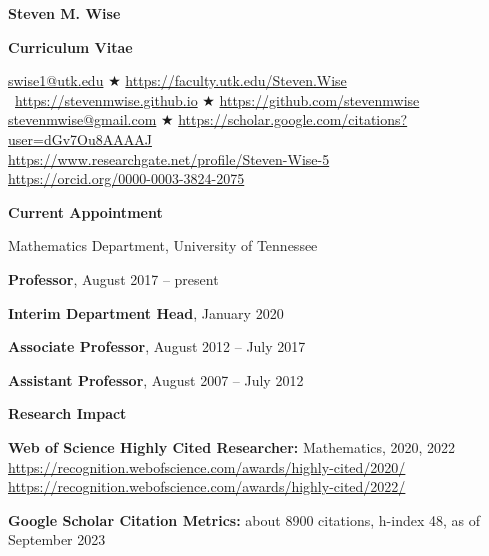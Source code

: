\documentclass[11pt]{letter}
\begin{document}
    
    \begin{center}
    
{\Huge\bf  Steven M. Wise}

{\Large\bf  Curriculum Vitae}


\url{swise1@utk.edu}  $\bigstar$  \url{https://faculty.utk.edu/Steven.Wise}
	\
\url{https://stevenmwise.github.io}  $\bigstar$    \url{https://github.com/stevenmwise}
	\\
\url{stevenmwise@gmail.com}  $\bigstar$   \url{https://scholar.google.com/citations?user=dGv7Ou8AAAAJ}
	\\
\url{https://www.researchgate.net/profile/Steven-Wise-5}
	\\
\url{https://orcid.org/0000-0003-3824-2075}
    \end{center}

    \medskip

{\LARGE\bf  Current Appointment}
    \begin{description}
    \item
Mathematics Department, University of Tennessee
	\begin{description}
	\item
\textbf{Professor}, August 2017 -- present
	\item
\textbf{Interim Department Head}, January 2020
	\item
\textbf{Associate Professor}, August 2012 -- July 2017
	\item
\textbf{Assistant Professor}, August 2007 -- July 2012
	\end{description}
	\end{description}
	
	\smallskip
	
{\LARGE\bf  Research Impact}
    \begin{description}
    \item
\textbf{Web of Science Highly Cited Researcher:} Mathematics, 2020, 2022
	\\
\url{https://recognition.webofscience.com/awards/highly-cited/2020/}
	\\
\url{https://recognition.webofscience.com/awards/highly-cited/2022/}
   	\item
\textbf{Google Scholar Citation Metrics:} about 8900 citations, h-index 48, as of September 2023
    \end{description}
    
    \smallskip
	
\end{document}

